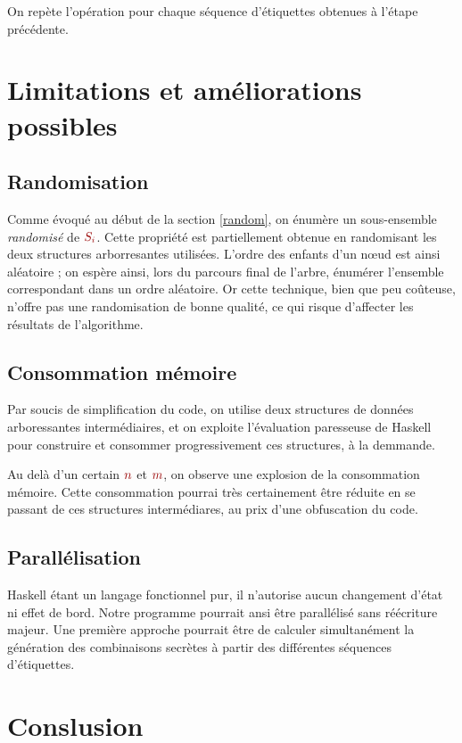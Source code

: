 \documentclass[a4paper]{article}
\renewcommand{\(}{\begin{math}\color{brick}}
\renewcommand{\)}{\end{math}}
\begin{document}
On repète l'opération pour chaque séquence d'étiquettes obtenues à l'étape précédente.

\section{Limitations et améliorations possibles}

\subsection{Randomisation}
Comme évoqué au début de la section \ref{random}, on énumère un sous-ensemble {\em randomisé} de \(S_i\). Cette propriété est partiellement obtenue en randomisant les deux structures arborresantes utilisées. L'ordre des enfants d'un nœud est ainsi aléatoire ; on espère ainsi, lors du parcours final de l'arbre, énumérer l'ensemble correspondant dans un ordre aléatoire. Or cette technique, bien que peu coûteuse, n'offre pas une randomisation de bonne qualité, ce qui risque d'affecter les résultats de l'algorithme.

\subsection{Consommation mémoire}
Par soucis de simplification du code, on utilise deux structures de données arboressantes intermédiaires, et on exploite l'évaluation paresseuse de Haskell pour construire et consommer progressivement ces structures, à la demmande.

Au delà d'un certain \(n\) et \(m\), on observe une explosion de la consommation mémoire. Cette consommation pourrai très certainement être réduite en se passant de ces structures intermédiares, au prix d'une obfuscation du code.

\subsection{Parallélisation}
Haskell étant un langage fonctionnel pur, il n'autorise aucun changement d'état ni effet de bord. Notre programme pourrait ansi être parallélisé sans réécriture majeur. Une première approche pourrait être de calculer simultanément la génération des combinaisons secrètes à partir des différentes séquences d'étiquettes.

\section{Conslusion}
\end{document}
